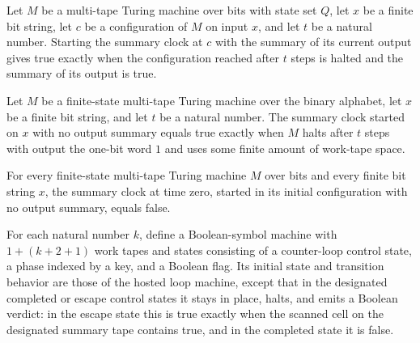 \begin{lemma}
\label{Turing.MachineFormat.summaryClock_correct}
\leanok
{}
Let $M$ be a multi-tape Turing machine over bits with state set $Q$, let $x$ be a finite
bit string, let $c$ be a configuration of $M$ on input $x$, and let $t$ be a natural
number. Starting the summary clock at $c$ with the summary of its current output gives
true exactly when the configuration reached after $t$ steps is halted and the summary of
its output is true.
\end{lemma}

\begin{lemma}
\label{Turing.MachineFormat.summaryClock_accepts}
\leanok
{}
Let $M$ be a finite-state multi-tape Turing machine over the binary alphabet, let $x$ be
a finite bit string, and let $t$ be a natural number. The summary clock started on $x$
with no output summary equals true exactly when $M$ halts after $t$ steps with output
the one-bit word $1$ and uses some finite amount of work-tape space.
\end{lemma}

\begin{lemma}
\label{Turing.MachineFormat.summaryClock_zero}
\leanok
{}
For every finite-state multi-tape Turing machine $M$ over bits and every finite bit
string $x$, the summary clock at time zero, started in its initial configuration with no
output summary, equals false.
\end{lemma}

\begin{definition}
\label{Turing.MachineFormat.h1HostedVerdictTM}
\leanok
{}
For each natural number $k$, define a Boolean-symbol machine with $1+(k+2+1)$ work tapes
and states consisting of a counter-loop control state, a phase indexed by a key, and a
Boolean flag. Its initial state and transition behavior are those of the hosted loop
machine, except that in the designated completed or escape control states it stays in
place, halts, and emits a Boolean verdict: in the escape state this is true exactly when
the scanned cell on the designated summary tape contains true, and in the completed
state it is false.
\end{definition}

